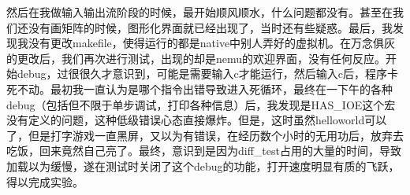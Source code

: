 \documentclass[UTF8,a4paper,10pt]{ctexart}
\begin{document}
然后在我做输入输出流阶段的时候，最开始顺风顺水，什么问题都没有。甚至在我们还没有画矩阵的时候，图形化界面就已经出现了，当时还有些疑惑。最后，我发现我没有更改makefile，使得运行的都是native中别人弄好的虚拟机。在万念俱灰的更改后，我们再次进行测试，出现的却是nemu的欢迎界面，没有任何反应。开始debug，过很很久才意识到，可能是需要输入c才能运行，然后输入c后，程序卡死不动。最初我一直认为是哪个指令出错导致进入死循环，最终在一下午的各种debug（包括但不限于单步调试，打印各种信息）后，我发现是HAS\_IOE这个宏没有定义的问题，这种低级错误心态直接爆炸。但是，这时虽然helloworld可以了，但是打字游戏一直黑屏，又以为有错误，在经历数个小时的无用功后，放弃去吃饭，回来竟然自己亮了。最终，意识到是因为diff\_test占用的大量的时间，导致加载以为缓慢，遂在测试时关闭了这个debug的功能，打开速度明显有质的飞跃，得以完成实验。




















































\end{document}
